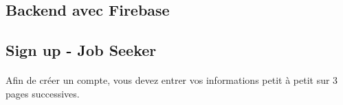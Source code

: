 \documentclass[a4paper]{article}
\begin{document}
    \newpage
    \begin{multicols}{2}
        \section{Backend avec Firebase}
        \subsection{Sign up - Job Seeker}
        \paragraph{}
        Afin de créer un compte, vous devez entrer vos informations petit à petit sur 3 pages successives. 
        

\end{multicols}
\end{document}
